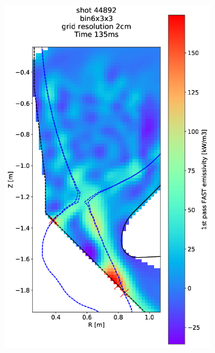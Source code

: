 \begin{figure}
     \centering
     \begin{subfigure}{0.21\textwidth}
         \centering
         \includegraphics[trim={0 0 25 0},clip,width=\textwidth]{Chapters/chapter2/figs/44892_1.png}
         \label{fig:44892_1}
     \end{subfigure}
     \hfill
     \begin{subfigure}{0.2\textwidth}
         \centering

\end{subfigure}
\end{figure}

